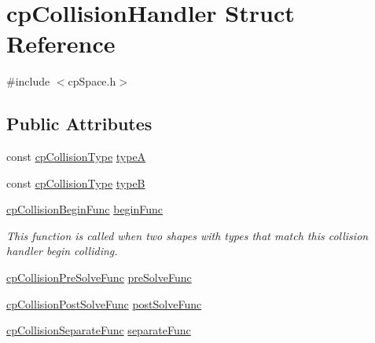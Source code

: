 \hypertarget{structcp_collision_handler}{}\section{cp\+Collision\+Handler Struct Reference}
\label{structcp_collision_handler}


{\ttfamily \#include $<$cp\+Space.\+h$>$}

\subsection*{Public Attributes}
\begin{DoxyCompactItemize}
\item 
const \mbox{\hyperlink{group__basic_types_gae83e2f50965eb441e36ffff1e32e6d02}{cp\+Collision\+Type}} \mbox{\hyperlink{structcp_collision_handler_a07bbc9d26af9d41cc87bae6514930d9f}{typeA}}
\item 
const \mbox{\hyperlink{group__basic_types_gae83e2f50965eb441e36ffff1e32e6d02}{cp\+Collision\+Type}} \mbox{\hyperlink{structcp_collision_handler_a7f9def10b179d18de37bec5b3c6d8621}{typeB}}
\item 
\mbox{\label{structcp_collision_handler_a64f552c94d44dfd3844869ea9dada78f}} 
\mbox{\hyperlink{group__cp_space_ga3134f145bfc7ca4ef69b350978c26a5a}{cp\+Collision\+Begin\+Func}} \mbox{\hyperlink{structcp_collision_handler_a64f552c94d44dfd3844869ea9dada78f}{begin\+Func}}
\begin{DoxyCompactList}\small\item\em This function is called when two shapes with types that match this collision handler begin colliding. \end{DoxyCompactList}\item 
\mbox{\hyperlink{group__cp_space_ga89b24d53d81a5a028198c3c2d3c39a9d}{cp\+Collision\+Pre\+Solve\+Func}} \mbox{\hyperlink{structcp_collision_handler_aff35bdeedae80600cbbb1a68682a7431}{pre\+Solve\+Func}}
\item 
\mbox{\hyperlink{group__cp_space_gaccb60bbb090c97823f49ee49e4e5d3c3}{cp\+Collision\+Post\+Solve\+Func}} \mbox{\hyperlink{structcp_collision_handler_adc3df1896d48519cc5359c51bd67ac98}{post\+Solve\+Func}}
\item 
\mbox{\label{structcp_collision_handler_a1823a67807ba11b1bae7f41024cd6ce0}} 
\mbox{\hyperlink{group__cp_space_ga01427ab634c483879cfed5bb22610487}{cp\+Collision\+Separate\+Func}} \mbox{\hyperlink{structcp_collision_handler_a1823a67807ba11b1bae7f41024cd6ce0}{separate\+Func}}

\end{DoxyCompactItemize}
